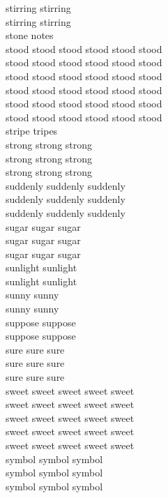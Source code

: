 stirring stirring\\
stirring stirring\\
stone notes\\
stood stood stood stood stood stood\\
stood stood stood stood stood stood\\
stood stood stood stood stood stood\\
stood stood stood stood stood stood\\
stood stood stood stood stood stood\\
stood stood stood stood stood stood\\
stripe tripes\\
strong strong strong\\
strong strong strong\\
strong strong strong\\
suddenly suddenly suddenly\\
suddenly suddenly suddenly\\
suddenly suddenly suddenly\\
sugar sugar sugar\\
sugar sugar sugar\\
sugar sugar sugar\\
sunlight sunlight\\
sunlight sunlight\\
sunny sunny\\
sunny sunny\\
suppose suppose\\
suppose suppose\\
sure sure sure\\
sure sure sure\\
sure sure sure\\
sweet sweet sweet sweet sweet\\
sweet sweet sweet sweet sweet\\
sweet sweet sweet sweet sweet\\
sweet sweet sweet sweet sweet\\
sweet sweet sweet sweet sweet\\
symbol symbol symbol\\
symbol symbol symbol\\
symbol symbol symbol\\


